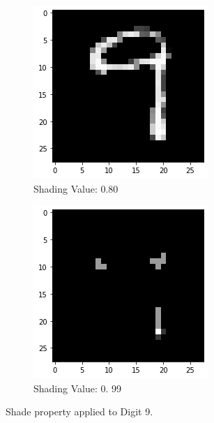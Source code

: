 \begin{figure}[htb!]
\begin{subfigure}[b]{.3\textwidth}
            \includegraphics[width=\textwidth]{images/shade2.png}
            \caption{Shading Value: 0.80}
            \label{fig:Rotate-misclass0}
        \end{subfigure}%
        \begin{subfigure}[b]{.3\textwidth}
            \centering
            \includegraphics[width=\linewidth]{images/shade3.png}
            \caption{Shading Value: 0. 99}
            \label{fig:Rotate-misclass0}
        \end{subfigure}
        
        \caption{Shade property applied to Digit 9.}
        \label{fig:Shade-property}
    \end{figure}
    \FloatBarrier
    
